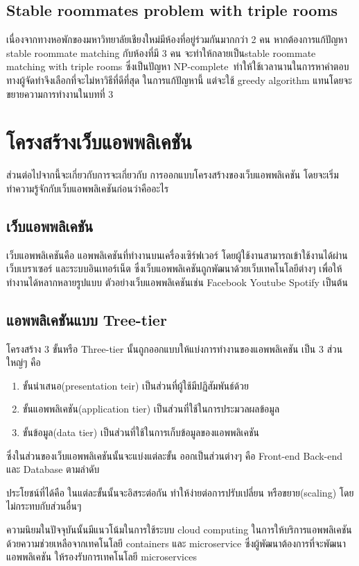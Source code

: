 \subsection{Stable roommates problem with triple rooms}
เนื่องจากทางหอพักของมหาวิทยาลัยเชียงใหม่มีห้องที่อยู่ร่วมกันมากกว่า 2 คน หากต้องการแก้ปัญหา stable roommate matching 
กับห้องที่มี 3 คน จะทำให้กลายเป็นstable roommate matching with triple rooms ซึ่งเป็นปัญหา 
NP-complete~\cite{iwama2007stable}ทำให้ใช้เวลานานในการหาคำตอบ ทางผู้จัดทำจึงเลือกที่จะไม่หาวิธีที่ดีที่สุด ในการแก้ปัญหานี้
แต่จะใช้ greedy algorithm แทนโดยจะขยายความการทำงานในบทที่ 3

\section{โครงสร้างเว็บแอพพลิเคชัน}
ส่วนต่อไปจากนี้จะเกี่ยวกับการจะเกี่ยวกับ การออกแบบโครงสร้างของเว็บแอพพลิเคชัน 
โดยจะเริ่มทำความรู้จักกับเว็บแอพพลิเคชันก่อนว่าคืออะไร
\subsection{เว็บแอพพลิเคชัน}
เว็บแอพพลิเคชันคือ แอพพลิเคชันที่ทำงานบนเครื่องเซิร์ฟเวอร์ โดยผู้ใช้งานสามารถเข้าใช้งานได้ผ่านเว็บเบราเซอร์ และระบบอินเทอร์เน็ต
ซึ่งเว็บแอพพลิเคชันถูกพัฒนาด้วยเว็บเทคโนโลยีต่างๆ เพื่อให้ทำงานได้หลากหลายรูปแบบ ตัวอย่างเว็บแอพพลิเคชันเช่น 
Facebook Youtube Spotify เป็นต้น

\subsection{แอพพลิเคชันแบบ Tree-tier}
โครงสร้าง 3 ขั้นหรือ Three-tier  นั้นถูกออกแบบให้แบ่งการทำงานของแอพพลิเคชัน เป็น 3 ส่วนใหญ่ๆ คือ
\begin{enumerate}
      \item ขั้นนำเสนอ(presentation teir) เป็นส่วนที่ผู้ใช้มีปฏิสัมพันธ์ด้วย
      \item ขั้นแอพพลิเคชัน(application tier) เป็นส่วนที่ใช้ในการประมวลผลข้อมูล
      \item ขั้นข้อมูล(data tier) เป็นส่วนที่ใช้ในการเก็บข้อมูลของแอพพลิเคชัน
\end{enumerate}
ซึ่งในส่วนของเว็บแอพพลิเคชันนั้นจะแบ่งแต่ละขั้น ออกเป็นส่วนต่างๆ คือ Front-end Back-end และ Database ตามลำดับ

ประโยชน์ที่ได้คือ ในแต่ละขั้นนั้นจะอิสระต่อกัน ทำให้ง่ายต่อการปรับเปลี่ยน 
หรือขยาย(scaling) โดยไม่กระทบกับส่วนอื่นๆ

ความนิยมในปัจจุบันนั้นมีแนวโน้มในการใช้ระบบ cloud computing ในการให้บริการแอพพลิเคชัน
ด้วยความช่วยเหลือจากเทคโนโลยี containers และ microservice ซึ่งผู้พัฒนาต้องการที่จะพัฒนาแอพพลิเคชัน 
ให้รองรับการเทคโนโลยี microservices
